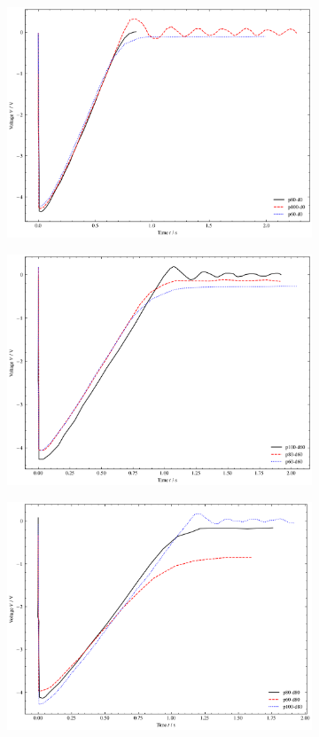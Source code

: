 \begin{figure}
	\centering
	\begin{subfigure}{0.48\columnwidth}
		\centering
		\includegraphics[width=0.8\linewidth]{src/figures/oscilloscope-grouped/d-0.png}
		\label{fig:oscilloscope-grouped-d-0}
	\end{subfigure}
	\begin{subfigure}{0.48\columnwidth}
		\centering
		\includegraphics[width=0.8\linewidth]{src/figures/oscilloscope-grouped/d-60.png}
	\end{subfigure}
	\begin{subfigure}{0.48\columnwidth}
		\centering
		\includegraphics[width=0.8\linewidth]{src/figures/oscilloscope-grouped/d-80.png}

\end{subfigure}
\end{figure}
